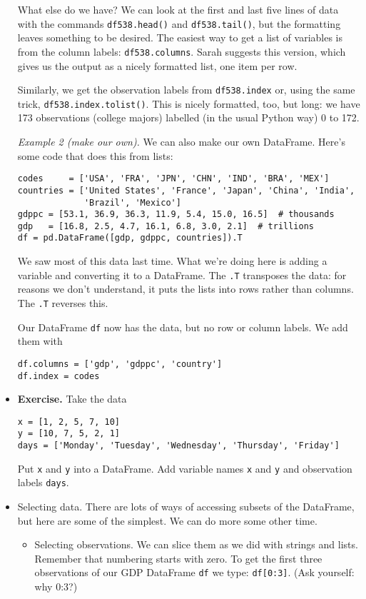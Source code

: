 \documentclass[11pt]{article}
\begin{document}
\begin{itemize}
What else do we have?
We can look at the first and last five lines of data with the
commands {\tt df538.head()} and {\tt df538.tail()},
but the formatting leaves something to be desired.
The easiest way to get a list of variables is from the column labels:
{\tt df538.columns}.
Sarah suggests this version, which gives us the output as a nicely formatted list,
one item per row.

Similarly, we get the observation labels from
{\tt df538.index} or, using the same trick, {\tt df538.index.tolist()}.
This is nicely formatted, too, but long:  we have 173 observations (college majors)
labelled (in the usual Python way) 0 to 172.


{\it Example 2 (make our own).\/}
We can also make our own DataFrame.  Here's some code that does this from lists:
\begin{verbatim}
codes     = ['USA', 'FRA', 'JPN', 'CHN', 'IND', 'BRA', 'MEX']
countries = ['United States', 'France', 'Japan', 'China', 'India',
             'Brazil', 'Mexico']
gdppc = [53.1, 36.9, 36.3, 11.9, 5.4, 15.0, 16.5]  # thousands
gdp   = [16.8, 2.5, 4.7, 16.1, 6.8, 3.0, 2.1]  # trillions
df = pd.DataFrame([gdp, gdppc, countries]).T
\end{verbatim}
We saw most of this data last time.
What we're doing here is adding a variable and converting it to a DataFrame.
The {\tt .T} transposes the data:  for reasons we don't understand,
it puts the lists into rows rather than columns.
The {\tt .T} reverses this.

Our DataFrame {\tt df} now has the data, but no row or column labels.
We add them with
\begin{verbatim}
df.columns = ['gdp', 'gdppc', 'country']
df.index = codes
\end{verbatim}

\item {\bf Exercise.}
Take the data
\begin{verbatim}
x = [1, 2, 5, 7, 10]
y = [10, 7, 5, 2, 1]
days = ['Monday', 'Tuesday', 'Wednesday', 'Thursday', 'Friday']
\end{verbatim}
Put {\tt x} and {\tt y} into a DataFrame.
Add variable names {\tt x} and {\tt y} and observation labels {\tt days}.


\item Selecting data.
There are lots of ways of accessing subsets of the DataFrame,
but here are some of the simplest.
We can do more some other time.
\begin{itemize}
\item Selecting observations.  We can slice them as we did with strings
and lists.  Remember that numbering starts with zero.
To get the first three observations of our GDP DataFrame {\tt df} we type:
{\tt df[0:3]}.
(Ask yourself:  why 0:3?)


\end{itemize}
\end{itemize}
\end{document}
